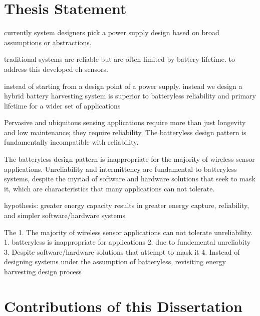 \section{Thesis Statement}

currently system designers pick a power supply design based on broad assumptions or abstractions. 

traditional systems are reliable but are often limited by battery lifetime. to address this developed eh sensors.

instead of starting from a design point of a power supply. instead we design 
a hybrid battery harvesting system is superior to batteryless reliability and primary lifetime for a wider set of applications

Pervasive and ubiquitous sensing applications require more than just longevity and low maintenance; they require reliability. The batteryless design pattern is fundamentally incompatible with reliability. 

The batteryless design pattern is inappropriate for the majority of wireless sensor applications. 
Unreliability and intermittency are fundamental to batteryless systems, despite the myriad of software and hardware solutions that seek to mask it, which are characteristics that many applications can not tolerate.

hypothesis: greater energy capacity results in greater energy capture, reliability, and simpler software/hardware systems

The 
1. The majority of wireless sensor applications can not tolerate unreliability.
1. batteryless is inappropriate for applications
2. due to fundemental unreliabity 
3. Despite software/hardware solutions that attempt to mask it
4. Instead of designing systems under the assumption of batteryless, revisiting energy harvesting design process 


\the\textwidth

\section{Contributions of this Dissertation}



